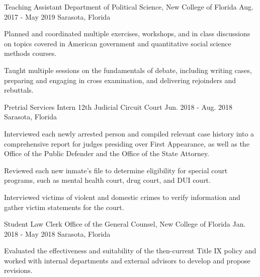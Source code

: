 \begin{cventries}
    \cventry
      {Teaching Assistant} %
      {Department of Political Science, New College of Florida} %
      {Aug. 2017 - May 2019} %
      {Sarasota, Florida} %
      {
        \begin{cvitems} %
          \item {Planned and coordinated multiple exercises, workshops, and in class discussions on topics covered in American government and quantitative social science methods courses.}
          \item {Taught multiple sessions on the fundamentals of debate, including writing cases, preparing and engaging in cross examination, and delivering rejoinders and rebuttals.}
        \end{cvitems}
      }

  \cventry
    {Pretrial Services Intern} %
    {12th Judicial Circuit Court} %
    {Jun. 2018 - Aug. 2018} %
    {Sarasota, Florida} %
    {
      \begin{cvitems} %
        \item {Interviewed each newly arrested person and compiled relevant case history into a comprehensive report for judges presiding over First Appearance, as well as the Office of the Public Defender and the Office of the State Attorney.}
        \item {Reviewed each new inmate’s file to determine eligibility for special court programs, such as mental health court, drug court, and DUI court.}
        \item {Interviewed victims of violent and domestic crimes to verify information and gather victim statements for the court.}
      \end{cvitems}
    }

  \cventry
    {Student Law Clerk} %
    {Office of the General Counsel, New College of Florida} %
    {Jan. 2018 - May 2018} %
    {Sarasota, Florida} %
    {
      \begin{cvitems} %
        \item {Evaluated the effectiveness and suitability of the then-current Title IX policy and worked with internal departments and external advisors to develop and propose revisions.}
      \end{cvitems}
    }


\end{cventries}
